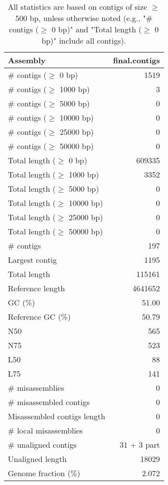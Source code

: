 \documentclass[12pt,a4paper]{article}
\begin{document}
\begin{table}[ht]
\begin{center}
\caption{All statistics are based on contigs of size $\geq$ 500 bp, unless otherwise noted (e.g., "\# contigs ($\geq$ 0 bp)" and "Total length ($\geq$ 0 bp)" include all contigs).}
\begin{tabular}{|l*{1}{|r}|}
\hline
Assembly & final.contigs \\ \hline
\# contigs ($\geq$ 0 bp) & 1519 \\ \hline
\# contigs ($\geq$ 1000 bp) & 3 \\ \hline
\# contigs ($\geq$ 5000 bp) & 0 \\ \hline
\# contigs ($\geq$ 10000 bp) & 0 \\ \hline
\# contigs ($\geq$ 25000 bp) & 0 \\ \hline
\# contigs ($\geq$ 50000 bp) & 0 \\ \hline
Total length ($\geq$ 0 bp) & 609335 \\ \hline
Total length ($\geq$ 1000 bp) & 3352 \\ \hline
Total length ($\geq$ 5000 bp) & 0 \\ \hline
Total length ($\geq$ 10000 bp) & 0 \\ \hline
Total length ($\geq$ 25000 bp) & 0 \\ \hline
Total length ($\geq$ 50000 bp) & 0 \\ \hline
\# contigs & 197 \\ \hline
Largest contig & 1195 \\ \hline
Total length & 115161 \\ \hline
Reference length & 4641652 \\ \hline
GC (\%) & 51.00 \\ \hline
Reference GC (\%) & 50.79 \\ \hline
N50 & 565 \\ \hline
N75 & 523 \\ \hline
L50 & 88 \\ \hline
L75 & 141 \\ \hline
\# misassemblies & 0 \\ \hline
\# misassembled contigs & 0 \\ \hline
Misassembled contigs length & 0 \\ \hline
\# local misassemblies & 0 \\ \hline
\# unaligned contigs & 31 + 3 part \\ \hline
Unaligned length & 18029 \\ \hline
Genome fraction (\%) & 2.072 \\ \hline

\end{tabular}
\end{center}
\end{table}
\end{document}
